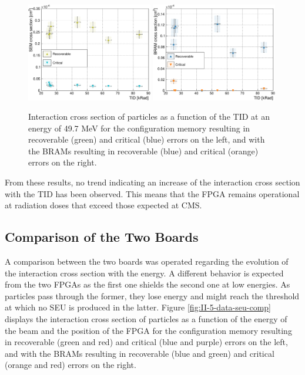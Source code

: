       \begin{figure}[h!]
        \centering
        \includegraphics[width=0.49\textwidth]{img/plots/cDose_SEM-crop}
        \includegraphics[width=0.49\textwidth]{img/plots/cDose_BRAM-crop}
        \caption{Interaction cross section of particles as a function of the TID at an energy of 49.7 MeV for the configuration memory resulting in recoverable (green) and critical (blue) errors on the left, and with the BRAMs resulting in recoverable (blue) and critical (orange) errors on the right.}
        \label{fig:II-5-data-seu-tid}
      \end{figure}

      From these results, no trend indicating an increase of the interaction cross section with the TID has been observed. This means that the FPGA remains operational at radiation doses that exceed those expected at CMS.

    \subsection{Comparison of the Two Boards}

      A comparison between the two boards was operated regarding the evolution of the interaction cross section with the energy. A different behavior is expected from the two FPGAs as the first one shields the second one at low energies. As particles pass through the former, they lose energy and might reach the threshold at which no SEU is produced in the latter. Figure \ref{fig:II-5-data-seu-comp} displays the interaction cross section of particles as a function of the energy of the beam and the position of the FPGA for the configuration memory resulting in recoverable (green and red) and critical (blue and purple) errors on the left, and with the BRAMs resulting in recoverable (blue and green) and critical (orange and red) errors on the right. \\

